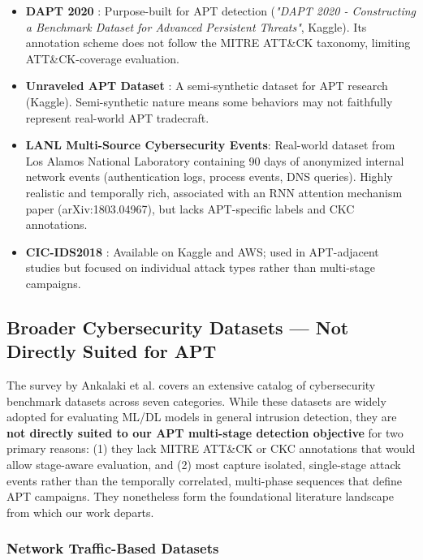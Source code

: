 \begin{itemize}
    \item \textbf{DAPT 2020} \cite{myneni2020dapt}: Purpose-built for APT detection (\textit{"DAPT 2020 - Constructing a Benchmark Dataset for Advanced Persistent Threats"}, Kaggle). Its annotation scheme does not follow the MITRE ATT\&CK taxonomy, limiting ATT\&CK-coverage evaluation.
    \item \textbf{Unraveled APT Dataset} \cite{myneni2023unraveled}: A semi-synthetic dataset for APT research (Kaggle). Semi-synthetic nature means some behaviors may not faithfully represent real-world APT tradecraft.
    \item \textbf{LANL Multi-Source Cybersecurity Events}: Real-world dataset from Los Alamos National Laboratory containing 90 days of anonymized internal network events (authentication logs, process events, DNS queries). Highly realistic and temporally rich, associated with an RNN attention mechanism paper (arXiv:1803.04967), but lacks APT-specific labels and CKC annotations.
    \item \textbf{CIC-IDS2018} \cite{hewapathirana2025comparative}: Available on Kaggle and AWS; used in APT-adjacent studies but focused on individual attack types rather than multi-stage campaigns.
\end{itemize}


\subsection{Broader Cybersecurity Datasets --- Not Directly Suited for APT}

The survey by Ankalaki et al. covers an extensive catalog of cybersecurity benchmark datasets across seven categories. While these datasets are widely adopted for evaluating ML/DL models in general intrusion detection, they are \textbf{not directly suited to our APT multi-stage detection objective} for two primary reasons: (1) they lack MITRE ATT\&CK or CKC annotations that would allow stage-aware evaluation, and (2) most capture isolated, single-stage attack events rather than the temporally correlated, multi-phase sequences that define APT campaigns. They nonetheless form the foundational literature landscape from which our work departs.

\subsubsection{Network Traffic-Based Datasets}

